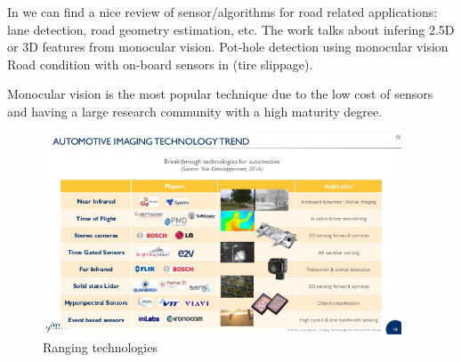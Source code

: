 In \cite{Lundquist2011} we can find a nice review of sensor/algorithms for road 
related applications: lane detection, road geometry estimation, etc.
The work \cite{Yebes2015} talks about infering 2.5D or 3D features from monocular 
vision.
Pot-hole detection using monocular vision
Road condition with on-board sensors in \cite{CastilloAguilar2015} (tire slippage).

Monocular vision is the most popular technique due to the low cost of sensors and 
having a large research community with a high maturity degree.

\begin{figure}[h]
    \centering
    \includegraphics[width=0.95\textwidth]{"img/imaging-technologies-for-automotive-2016-report-by-yole"}
    \caption{Ranging technologies}
    \label{fig:ranging-techs}
\end{figure}


